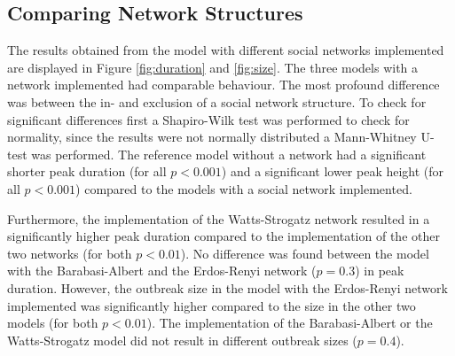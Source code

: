 \documentclass[10pt]{article}
\begin{document}
    \subsection{Comparing Network Structures}
    The results obtained from the model with different social networks implemented are displayed in Figure \ref{fig:duration} and \ref{fig:size}. The three models with a network implemented had comparable behaviour. The most profound difference was between the in- and exclusion of a social network structure. To check for significant differences first a Shapiro-Wilk test was performed to check for normality, since the results were not normally distributed a Mann-Whitney U-test was performed. The reference model without a network had a significant shorter peak duration (for all $ p < 0.001$) and a significant lower peak height (for all $ p < 0.001$) compared to the models with a social network implemented.

    Furthermore, the implementation of the Watts-Strogatz network resulted in a significantly higher peak duration compared to the implementation of the other two networks (for both $p<0.01$). No difference was found between the model with the Barabasi-Albert and the Erdos-Renyi network ($p = 0.3$) in peak duration. However, the outbreak size in the model with the Erdos-Renyi network implemented was significantly higher compared to the size in the other two models (for both $p<0.01$). The implementation of the Barabasi-Albert or the Watts-Strogatz model did not result in different outbreak sizes ($p = 0.4$).

\end{document}
